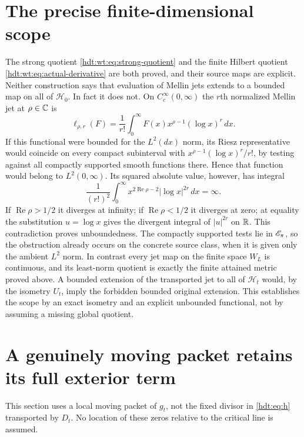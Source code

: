 \section{The precise finite-dimensional scope}
\label{hdt:wt:sec:scope}

The strong quotient \eqref{hdt:wt:eq:strong-quotient} and the finite
Hilbert quotient \eqref{hdt:wt:eq:actual-derivative} are both proved,
and their source maps are explicit.  Neither construction says
that evaluation of Mellin jets extends to a bounded map on all
of $\mathcal H_0$.  In fact it does not.  On $C_c^\infty(0,\infty)$
the $r$th normalized Mellin jet at $\rho\in\mathbb C$ is
\[
 \ell_{\rho,r}(F)=\frac1{r!}\int_0^\infty
       F(x)x^{\rho-1}(\log x)^r\,dx.
\]
If this functional were bounded for the $L^2(dx)$ norm, its
Riesz representative would coincide on every compact subinterval
with $x^{\overline\rho-1}(\log x)^r/r!$, by testing against
all compactly supported smooth functions there.  Hence that
function would belong to $L^2(0,\infty)$.  Its squared absolute
value, however, has integral
\[
 \frac1{(r!)^2}\int_0^\infty
   x^{2\operatorname{Re}\rho-2}|\log x|^{2r}\,dx=\infty.
\]
If $\operatorname{Re}\rho>1/2$ it diverges at infinity;
if $\operatorname{Re}\rho<1/2$ it diverges at zero; at equality
the substitution $u=\log x$ gives the divergent integral of
$|u|^{2r}$ on $\mathbb R$.  This contradiction proves unboundedness.
The compactly supported tests lie in $\mathscr E_\pi$, so the obstruction
already occurs on the concrete source class, when it is given
only the ambient $L^2$ norm.  In contrast every jet map on the
finite space $W_L$ is continuous, and its least-norm quotient
is exactly the finite attained metric proved above.  A bounded
extension of the transported jet to all of $\mathcal H_t$ would, by the
isometry $U_t$, imply the forbidden bounded original extension.
This establishes the scope by an exact isometry and an explicit
unbounded functional, not by assuming a missing global quotient.


\section{A genuinely moving packet retains its full exterior term}

This section uses a local moving packet of $g_t$, not the fixed
divisor in \eqref{hdt:eq:h} transported by $D_t$. No location of these
zeros relative to the critical line is assumed.

